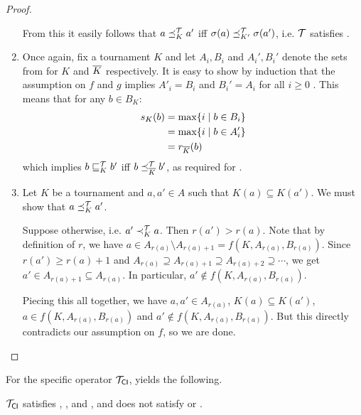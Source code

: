 \begin{proof}
\begin{enumerate}
    From this it easily follows that $a \preceq_K^{\mathcal{T}} a'$ iff $\sigma(a)
            \preceq_{K'}^{\mathcal{T}} \sigma(a')$, i.e.  $\mathcal{T}$ satisfies \anon{}.

    \item
    Once again, fix a tournament $K$ and let $A_i, B_i$ and $A_i', B_i'$ denote
    the sets from  for $K$ and ${\overline{K}}$ respectively.
    It is easy to show by induction that the assumption on $f$ and $g$ implies
    $A'_i = B_i$ and $B_i' = A_i$ for all $i \ge 0$ . This means that for any
    $b \in B_K$:
    \begin{align*}
        s_K(b)
        &= \max\{i \mid b \in B_i\} \\
        &= \max\{i \mid b \in A_i'\} \\
        &= r_{{\overline{K}}}(b)
    \end{align*}
    which implies $b \sqsubseteq_K^{\mathcal{T}} b'$ iff $b \preceq_{{\overline{K}}}^{\mathcal{T}} b'$, as
    required for \dualaxiom{}.

    \item
    Let $K$ be a tournament and $a, a' \in A$ such that $K(a) \subseteq K(a')$.
    We must show that $a \preceq_K^{\mathcal{T}} a'$.

    Suppose otherwise, i.e. $a' \prec_K^{\mathcal{T}} a$. Then $r(a') > r(a)$. Note that
    by definition of $r$, we have $a \in A_{r(a)} \setminus A_{r(a) + 1} = f(K,
    A_{r(a)}, B_{r(a)})$. Since $r(a') \ge r(a) + 1$ and $A_{r(a)} \supseteq
    A_{r(a) + 1} \supseteq A_{r(a) + 2} \supseteq \cdots$, we get $a' \in
    A_{r(a) + 1} \subseteq A_{r(a)}$. In particular, $a' \notin f(K, A_{r(a)},
    B_{r(a)})$.

    Piecing this all together, we have $a, a' \in A_{r(a)}$, $K(a) \subseteq
    K(a')$, $a \in f(K, A_{r(a)}, B_{r(a)})$ and $a' \not\in f(K, A_{r(a)},
    B_{r(a)})$. But this directly contradicts our assumption on $f$, so we are
    done.
    \end{enumerate}
\end{proof}

For the specific operator ${\mathcal{T}_{\mathsf{CI}}}$,
 yields the following.

\begin{theorem}
    \label{tourn_result_tcardint_axioms}

    ${\mathcal{T}_{\mathsf{CI}}}$ satisfies \chaindef{}, \anon{},
    \dualaxiom{} and \mon{}, and does not satisfy \iim{} or
    \posresp{}.

\end{theorem}

